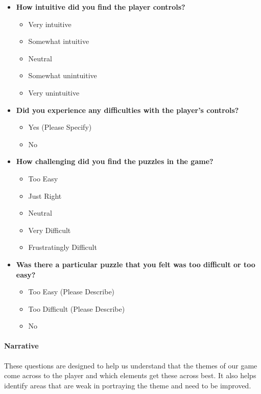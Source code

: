 \documentclass[
  letterpaper,
  DIV=11,
  numbers=noendperiod]{scrartcl}
\let\oldparagraph\paragraph
\renewcommand{\paragraph}[1]{\oldparagraph{#1}\mbox{}}
\providecommand{\tightlist}{%
  \setlength{\itemsep}{0pt}\setlength{\parskip}{0pt}}\usepackage{longtable,booktabs,array}
\begin{document}
\begin{itemize}
\tightlist
\item
  \textbf{How intuitive did you find the player controls?}

  \begin{itemize}
  \tightlist
  \item
    Very intuitive
  \item
    Somewhat intuitive
  \item
    Neutral
  \item
    Somewhat unintuitive
  \item
    Very unintuitive
  \end{itemize}
\item
  \textbf{Did you experience any difficulties with the player's
  controls?}

  \begin{itemize}
  \tightlist
  \item
    Yes (Please Specify)
  \item
    No
  \end{itemize}
\item
  \textbf{How challenging did you find the puzzles in the game?}

  \begin{itemize}
  \tightlist
  \item
    Too Easy
  \item
    Just Right
  \item
    Neutral
  \item
    Very Difficult
  \item
    Frustratingly Difficult
  \end{itemize}
\item
  \textbf{Was there a particular puzzle that you felt was too difficult
  or too easy?}

  \begin{itemize}
  \tightlist
  \item
    Too Easy (Please Describe)
  \item
    Too Difficult (Please Describe)
  \item
    No
  \end{itemize}
\end{itemize}

\paragraph{Narrative}\label{narrative}

These questions are designed to help us understand that the themes of
our game come across to the player and which elements get these across
best. It also helps identify areas that are weak in portraying the theme
and need to be improved.
\end{document}
